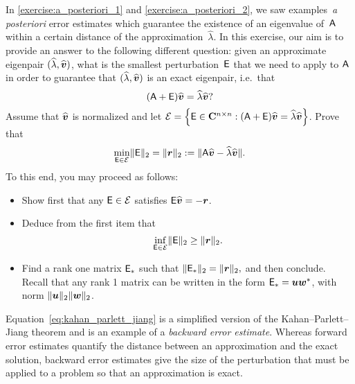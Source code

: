 \begin{exercise}
    In \cref{exercise:a_posteriori_1} and \cref{exercise:a_posteriori_2},
    we saw examples~\emph{a posteriori} error estimates
    which guarantee the existence of an eigenvalue of~$\mathsf A$ within a certain distance of the approximation~$\widehat \lambda$.
    In this exercise,
    our aim is to provide an answer to the following different question:
    given an approximate eigenpair $(\widehat \lambda, \widehat {\mathbf{\boldsymbol{v}}})$,
    what is the smallest perturbation~$\mathsf E$ that we need to apply to $\mathsf A$ in order to guarantee that
    $(\widehat \lambda, \widehat {\mathbf{\boldsymbol{v}}})$ is an exact eigenpair, i.e.\ that
    \[
        (\mathsf A + \mathsf E) \widehat {\mathbf{\boldsymbol{v}}} = \widehat \lambda \widehat {\mathbf{\boldsymbol{v}}}?
    \]
    Assume that $\widehat {\mathbf{\boldsymbol{v}}}$ is normalized and
    let $\mathcal E = \Bigl\{\mathsf E \in \mathbf C^{n \times n}: (\mathsf A + \mathsf E) \widehat {\mathbf{\boldsymbol{v}}} = \widehat \lambda \widehat {\mathbf{\boldsymbol{v}}} \Bigr\}$.
    Prove that
    \begin{equation}
        \label{eq:kahan_parlett_jiang}
        \min_{\mathsf E \in \mathcal E} \lVert\mathsf E\rVert_2 = \lVert\mathbf{\boldsymbol{r}}\rVert_2 := \lVert\mathsf A \widehat {\mathbf{\boldsymbol{v}}} - \widehat \lambda \widehat {\mathbf{\boldsymbol{v}}}\rVert.
    \end{equation}
    To this end,
    you may proceed as follows:
    \begin{itemize}
        \item
            Show first that any $\mathsf E \in \mathcal E$ satisfies $\mathsf E \widehat {\mathbf{\boldsymbol{v}}} = - \mathbf{\boldsymbol{r}}$.

        \item
            Deduce from the first item that
            \[
                \inf_{\mathsf E \in \mathcal E} \lVert\mathsf E\rVert_2 \geq \lVert\mathbf{\boldsymbol{r}}\rVert_2.
            \]

        \item
            Find a rank one matrix $\mathsf E_*$ such that
            \(
                \lVert\mathsf E_*\rVert_2 = \lVert\mathbf{\boldsymbol{r}}\rVert_2,
            \)
            and then conclude.
            Recall that any rank 1 matrix can be written in the form $\mathsf E_* = \mathbf{\boldsymbol{u}} \mathbf{\boldsymbol{w}}^*$,
            with norm $\lVert\mathbf{\boldsymbol{u}}\rVert_2 \lVert\mathbf{\boldsymbol{w}}\rVert_2$.
    \end{itemize}
    Equation~\eqref{eq:kahan_parlett_jiang} is a simplified version of the Kahan--Parlett--Jiang theorem
    and is an example of a \emph{backward error estimate}.
    Whereas forward error estimates quantify the distance between an approximation and the exact solution,
    backward error estimates give the size of the perturbation that must be applied to a problem so that an approximation is exact.
\end{exercise}

